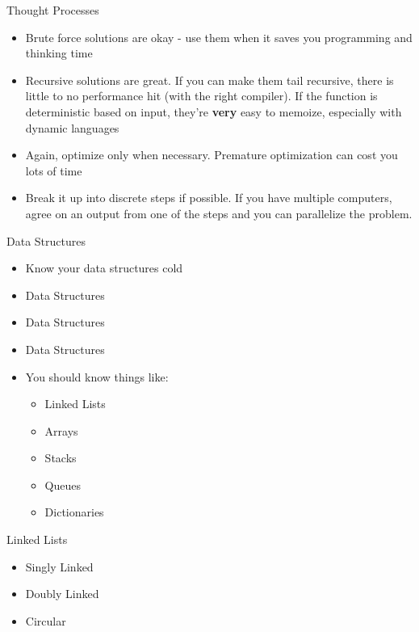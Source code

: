 \documentclass{beamer}
\begin{document}
\begin{frame}{Thought Processes}
  \begin{centering}
    \begin{itemize}
      \item Brute force solutions are okay - use them when it saves you programming and thinking time
      \item Recursive solutions are great. If you can make them tail recursive, there is little to no performance hit (with the right compiler). If the function is deterministic based on input, they're \textbf{very} easy to memoize, especially with dynamic languages
      \item Again, optimize only when necessary. Premature optimization  can cost you lots of time
      \item Break it up into discrete steps if possible. If you have multiple computers, agree on an output from one of the steps and you can parallelize the problem.
    \end{itemize}
  \end{centering}
\end{frame}

\begin{frame}{Data Structures}
  \begin{centering}
    \begin{itemize}
      \item Know your data structures cold
      \pause
      \item Data Structures
      \pause
      \item Data Structures
      \pause
      \item Data Structures
      \pause
      \item You should know things like:
      \begin{itemize}
        \item Linked Lists
        \item Arrays
        \item Stacks
        \item Queues
        \item Dictionaries
      \end{itemize}
    \end{itemize}
  \end{centering}
\end{frame}

\begin{frame}{Linked Lists}
  \begin{centering}
    \begin{itemize}
      \item Singly Linked
      \item Doubly Linked
      \item Circular
    \end{itemize}
  \end{centering}
\end{frame}
\end{document}
